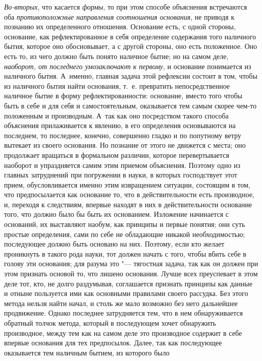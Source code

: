 {\em Во-вторых}, что касается
{\em формы}, то при этом способе объяснения встречаются
оба {\em противоположные направления соотношения
основания}, не приводя к познанию их определенного отношения. Основание
есть, с одной стороны, основание, как рефлектированное в себя определение
содержания того наличного бытия, которое оно обосновывает, а с другой
стороны, оно есть положенное. Оно есть то, из чего должно быть понято
наличное бытие; но на самом деле, {\em наоборот, от
последнего умозаключают к первому}, и основание понимается из наличного
бытия. А~именно, главная задача этой рефлексии состоит в том, чтобы из
наличного бытия найти основания, т.~е. превратить непосредственное наличное
бытие в форму рефлектированности: основание, вместо того чтобы быть в себе
и для себя и самостоятельным, оказывается тем самым скорее чем-то
положенным и производным. А~так как оно посредством такого способа
объяснения прилаживается к явлению, в его определения основываются на
последнем, то последнее, конечно, совершенно гладко и по попутному ветру
вытекает из своего основания. Но познание от этого не движется с места; оно
продолжает вращаться в формальном различии, которое перевертывается
наоборот и упраздняется самим этим приемом объяснения. Поэтому одно из
главных затруднений при погружении в науки, в которых господствует этот
прием, обусловливается именно этим извращением ситуации, состоящим в том,
что предпосылается как основание то, что в действительности есть
производное, и, переходя к следствиям, впервые находят в них в
действительности основание того, что должно было бы быть их основанием.
Изложение начинается с оснований, их выставляют наобум, как принципы и
первые понятия; они суть простые определения, сами по себе не обладающие
никакой необходимостью; последующее должно быть основано на них. Поэтому,
если кто желает проникнуть в такого рода науки, тот должен начать с того,
чтобы вбить себе в голову эти основания; для разума это "--- тягостная задача,
так как он должен при этом признать основой то, что лишено основания. Лучше
всех преуспевает в этом деле тот, кто, не долго раздумывая, соглашается
признать принципы как данные и отныне пользуется ими как основными
правилами своего рассудка. Без этого метода нельзя найти начал, и столь же
мало возможно без него дальнейшее продвижение. Однако последнее
затрудняется тем, что в нем обнаруживается обратный толчок метода, который
в последующем хочет обнаружить производное, между тем как на самом деле это
производное содержит в себе впервые основания для тех предпосылок. Далее,
так как последующее оказывается тем наличным бытием, из которого было
